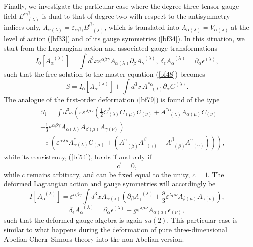 \documentclass[a4paper,11pt]{article}
\begin{document}
Finally, we investigate the particular case where the degree three tensor
gauge field $B_{\;\;\;(\lambda )}^{\alpha \beta }$ is dual to that of degree
two with respect to the antisymmetry indices only, $A_{\alpha (\lambda
)}=\varepsilon _{\alpha \beta \gamma }B_{\;\;\;(\lambda )}^{\beta \gamma }$,
which is translated into $A_{\alpha (\lambda )}=V_{\alpha (\lambda )}$ at
the level of action (\ref{bf33}) and of its gauge symmetries (\ref{bf34}).
In this situation, we start from the Lagrangian action and associated gauge
transformations
\begin{equation}
I_{0}\left[ A_{\alpha }^{\;\;(\lambda )}\right] =\int d^{3}x\varepsilon
^{\alpha \beta \gamma }A_{\alpha (\lambda )}\partial _{\beta }A_{\gamma
}^{\;\;(\lambda )},\;\delta _{\epsilon }A_{\alpha }^{\;\;(\lambda
)}=\partial _{\alpha }\epsilon ^{(\lambda )},  \label{bf104}
\end{equation}
such that the free solution to the master equation (\ref{bf48}) becomes
\begin{equation}
S=I_{0}\left[ A_{\alpha }^{\;\;(\lambda )}\right] +\int
d^{3}x\,A_{\;\;\;(\lambda )}^{*\alpha }\partial _{\alpha }C^{(\lambda )}.
\label{bf105}
\end{equation}
The analogue of the first-order deformation (\ref{bf79}) is found of the
type
\begin{eqnarray}
&&S_{1}=\int d^{3}x\left( c\varepsilon ^{\lambda \mu \nu }\left( \frac{1}{2}%
C_{(\lambda )}^{*}C_{(\mu )}C_{(\nu )}+A_{\;\;\;(\lambda )}^{*\alpha
}A_{\alpha (\mu )}C_{(\nu )}\right. \right.  \nonumber \\
&&\left. +\frac{1}{3}\varepsilon ^{\alpha \beta \gamma }A_{\alpha (\lambda
)}A_{\beta (\mu )}A_{\gamma (\nu )}\right)  \nonumber \\
&&\left. +c^{\prime }\left( \varepsilon ^{\alpha \lambda \mu }A_{\alpha
(\lambda )}^{*}C_{(\mu )}+\left( A_{\;\;(\beta )}^{\gamma }A_{\;\;(\gamma
)}^{\beta }-A_{\;\;(\beta )}^{\beta }A_{\;\;(\gamma )}^{\gamma }\right)
\right) \right) ,  \label{bf106}
\end{eqnarray}
while its consistency, (\ref{bf54}), holds if and only if
\begin{equation}
c^{\prime }=0,  \label{bf107}
\end{equation}
while $c$ remains arbitrary, and can be fixed equal to the unity, $c=1$. The
deformed Lagrangian action and gauge symmetries will accordingly be
\begin{equation}
I\left[ A_{\alpha }^{\;\;(\lambda )}\right] =\varepsilon ^{\alpha \beta
\gamma }\int d^{3}xA_{\alpha (\lambda )}\left( \partial _{\beta }A_{\gamma
}^{\;\;(\lambda )}+\frac{g}{3}\varepsilon ^{\lambda \mu \nu }A_{\beta (\mu
)}A_{\gamma (\nu )}\right) ,  \label{bf108}
\end{equation}
\begin{equation}
\bar{\delta}_{\epsilon }A_{\alpha }^{\;\;(\lambda )}=\partial _{\alpha
}\epsilon ^{(\lambda )}+g\varepsilon ^{\lambda \mu \nu }A_{\alpha (\mu
)}\epsilon _{(\nu )},  \label{bf109}
\end{equation}
such that the deformed gauge algebra is again $su(2)$. This particular case
is similar to what happens during the deformation of pure three-dimensional
Abelian Chern--Simons theory into the non-Abelian version.
\end{document}
